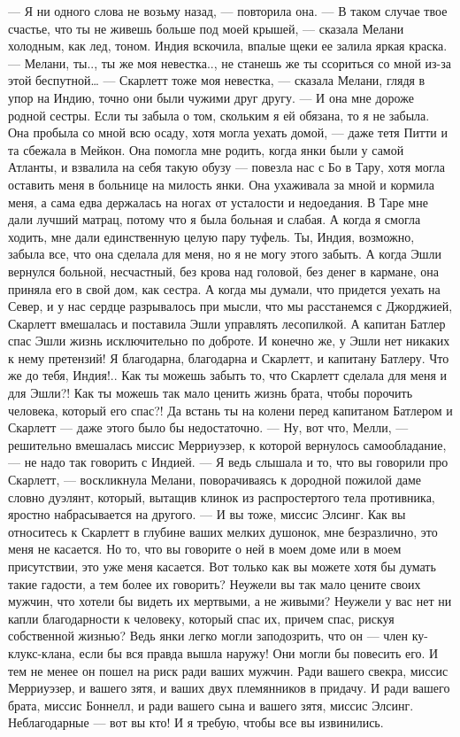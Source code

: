 — Я ни одного слова не возьму назад, — повторила она.
— В таком случае твое счастье, что ты не живешь больше под моей крышей, — сказала Мелани холодным, как лед, тоном. Индия вскочила, впалые щеки ее залила яркая краска.
— Мелани, ты.., ты же моя невестка.., не станешь же ты ссориться со мной из-за этой беспутной…
— Скарлетт тоже моя невестка, — сказала Мелани, глядя в упор на Индию, точно они были чужими друг другу. — И она мне дороже родной сестры. Если ты забыла о том, скольким я ей обязана, то я не забыла. Она пробыла со мной всю осаду, хотя могла уехать домой, — даже тетя Питти и та сбежала в Мейкон. Она помогла мне родить, когда янки были у самой Атланты, и взвалила на себя такую обузу — повезла нас с Бо в Тару, хотя могла оставить меня в больнице на милость янки. Она ухаживала за мной и кормила меня, а сама едва держалась на ногах от усталости и недоедания. В Таре мне дали лучший матрац, потому что я была больная и слабая. А когда я смогла ходить, мне дали единственную целую пару туфель. Ты, Индия, возможно, забыла все, что она сделала для меня, но я не могу этого забыть. А когда Эшли вернулся больной, несчастный, без крова над головой, без денег в кармане, она приняла его в свой дом, как сестра. А когда мы думали, что придется уехать на Север, и у нас сердце разрывалось при мысли, что мы расстанемся с Джорджией, Скарлетт вмешалась и поставила Эшли управлять лесопилкой. А капитан Батлер спас Эшли жизнь исключительно по доброте. И конечно же, у Эшли нет никаких к нему претензий! Я благодарна, благодарна и Скарлетт, и капитану Батлеру. Что же до тебя, Индия!.. Как ты можешь забыть то, что Скарлетт сделала для меня и для Эшли?! Как ты можешь так мало ценить жизнь брата, чтобы порочить человека, который его спас?! Да встань ты на колени перед капитаном Батлером и Скарлетт — даже этого было бы недостаточно.
— Ну, вот что, Мелли, — решительно вмешалась миссис Мерриуэзер, к которой вернулось самообладание, — не надо так говорить с Индией.
— Я ведь слышала и то, что вы говорили про Скарлетт, — воскликнула Мелани, поворачиваясь к дородной пожилой даме словно дуэлянт, который, вытащив клинок из распростертого тела противника, яростно набрасывается на другого. — И вы тоже, миссис Элсинг. Как вы относитесь к Скарлетт в глубине ваших мелких душонок, мне безразлично, это меня не касается. Но то, что вы говорите о ней в моем доме или в моем присутствии, это уже меня касается. Вот только как вы можете хотя бы думать такие гадости, а тем более их говорить? Неужели вы так мало цените своих мужчин, что хотели бы видеть их мертвыми, а не живыми? Неужели у вас нет ни капли благодарности к человеку, который спас их, причем спас, рискуя собственной жизнью? Ведь янки легко могли заподозрить, что он — член ку-клукс-клана, если бы вся правда вышла наружу! Они могли бы повесить его. И тем не менее он пошел на риск ради ваших мужчин. Ради вашего свекра, миссис Мерриуэзер, и вашего зятя, и ваших двух племянников в придачу. И ради вашего брата, миссис Боннелл, и ради вашего сына и вашего зятя, миссис Элсинг. Неблагодарные — вот вы кто! И я требую, чтобы все вы извинились.
